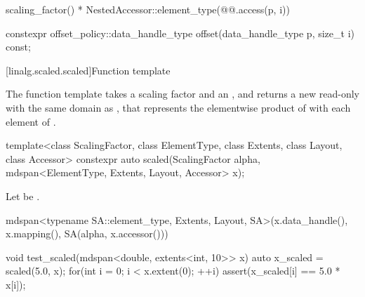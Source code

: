 \begin{itemdescr}
\pnum
\returns
\begin{codeblock}
scaling_factor() * NestedAccessor::element_type(@@.access(p, i))
\end{codeblock}
\end{itemdescr}

\begin{itemdecl}
constexpr offset_policy::data_handle_type offset(data_handle_type p, size_t i) const;
\end{itemdecl}

\begin{itemdescr}
\pnum
\returns
{}
\end{itemdescr}

[linalg.scaled.scaled]{Function template }

\pnum
The  function template takes
a scaling factor  and
an  , and
returns a new read-only  with the same domain as ,
that represents the elementwise product of 
with each element of .

\begin{itemdecl}
  template<class ScalingFactor,
           class ElementType, class Extents, class Layout, class Accessor>
    constexpr auto scaled(ScalingFactor alpha, mdspan<ElementType, Extents, Layout, Accessor> x);
\end{itemdecl}

\begin{itemdescr}
\pnum
Let  be .

\pnum
\returns
\begin{codeblock}
mdspan<typename SA::element_type, Extents, Layout, SA>(x.data_handle(), x.mapping(),
                                                       SA(alpha, x.accessor()))
\end{codeblock}
\end{itemdescr}

\pnum
\begin{example}
\begin{codeblock}
void test_scaled(mdspan<double, extents<int, 10>> x)
{
  auto x_scaled = scaled(5.0, x);
  for(int i = 0; i < x.extent(0); ++i) {
    assert(x_scaled[i] == 5.0 * x[i]);
  }
}
\end{codeblock}
\end{example}

